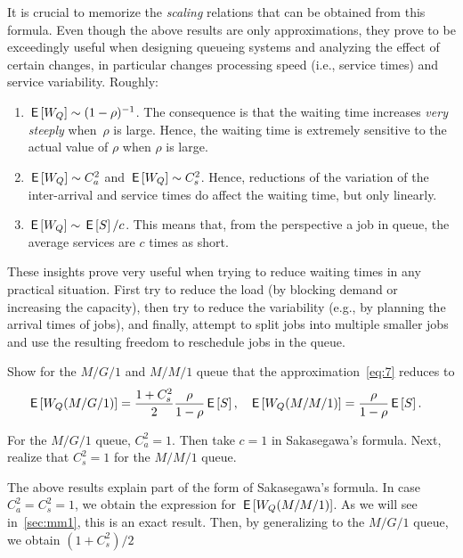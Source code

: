 It is crucial to memorize the \emph{scaling} relations that can be obtained from this formula.
Even though the above results are only approximations, they prove to be exceedingly useful when designing queueing systems and analyzing the effect of certain changes, in particular changes processing speed (i.e., service times) and service variability.
Roughly:
\begin{enumerate}
\item $\,\mathsf{E}\left[W_Q\right] \sim (1-\rho)^{-1}$. The consequence is that the waiting
 time increases \emph{very steeply} when~$\rho$ is large. Hence, the waiting time is
extremely sensitive to the actual value of $\rho$ when $\rho$ is large. 
\item $\,\mathsf{E}\left[W_Q\right] \sim C_a^2$ and $\,\mathsf{E}\left[W_Q\right] \sim C_s^2$.
 Hence, reductions of the variation of the inter-arrival and service times do affect the waiting time, but only linearly.
\item $\,\mathsf{E}\left[W_Q\right] \sim \,\mathsf{E}\left[S\right]/c$. This means that, from the perspective a job in queue,  the average services are $c$ times as short. 
\end{enumerate}

These insights prove very useful when trying to reduce waiting times in any practical situation.
First try to reduce the load (by blocking demand or increasing the capacity), then try to reduce the variability (e.g., by planning the arrival times of jobs), and finally, attempt to split jobs into multiple smaller jobs and use the resulting freedom to reschedule jobs in the queue.




\begin{exercise}
 Show for the  $M/G/1$ and $M/M/1$ queue that  the approximation~\cref{eq:7} reduces to
\begin{align*}
  \,\mathsf{E}\left[W_Q(M/G/1)\right] &= \frac{1+C_s^2}2\frac{\rho}{1-\rho} \,\mathsf{E}\left[S\right], & 
  \,\mathsf{E}\left[W_Q(M/M/1)\right] &= \frac{\rho}{1-\rho} \,\mathsf{E}\left[S\right].
\end{align*}
\begin{solution}
For the $M/G/1$ queue, $C_a^2=1$. Then take $c=1$ in Sakasegawa's formula. Next, realize that $C_s^2=1$ for the $M/M/1$ queue. 
\end{solution}
\end{exercise}
The above results explain part of the form of Sakasegawa's formula. In case $C_a^2=C_s^2=1$, we obtain the expression for $\,\mathsf{E}\left[W_Q(M/M/1)\right]$. 
As we will see in~\cref{sec:mm1}, this is an exact result. Then, by generalizing to the $M/G/1$ queue, we obtain $(1+C_s^2)/2$

